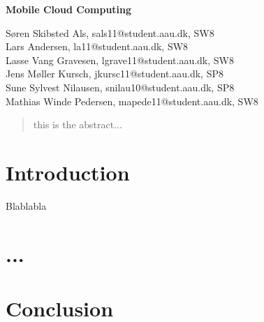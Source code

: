 \documentclass[12pt,a4paper]{article}
\begin{document}
\begin{center}
\bigskip\bigskip
{\Large\bf Mobile Cloud Computing\\}
\bigskip\bigskip


Søren Skibsted Als, sals11@student.aau.dk, SW8\\
Lars Andersen, la11@student.aau.dk, SW8\\
Lasse Vang Gravesen, lgrave11@student.aau.dk, SW8\\
Jens Møller Kursch, jkursc11@student.aau.dk, SP8\\
Sune Sylvest Nilausen, snilau10@student.aau.dk, SP8\\
Mathias Winde Pedersen, mapede11@student.aau.dk, SW8


\bigskip
\begin{abstract}
this is the abstract...
\end{abstract}

\thispagestyle{empty}
\end{center}


\titlepage

\thispagestyle{plain}


\section{Introduction}
Blablabla \citep{misc:mobilecloudcomputing}

\section{...}



\section{Conclusion}

\newpage


\label{bib:mybiblio}
\end{document}
